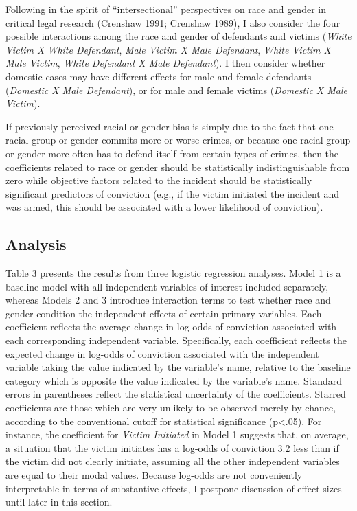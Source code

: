 \documentclass[12pt,article]{article}
\begin{document}
Following in the spirit of ``intersectional'' perspectives on race and
gender in critical legal research (Crenshaw 1991; Crenshaw 1989), I also
consider the four possible interactions among the race and gender of
defendants and victims (\emph{White Victim X White Defendant}, \emph{Male Victim X
Male Defendant}, \emph{White Victim X Male Victim}, \emph{White Defendant X Male
Defendant}). I then consider whether domestic cases may have different
effects for male and female defendants (\emph{Domestic X Male Defendant}), or
for male and female victims (\emph{Domestic X Male Victim}).

If previously perceived racial or gender bias is simply due to the fact
that one racial group or gender commits more or worse crimes, or because
one racial group or gender more often has to defend itself from certain
types of crimes, then the coefficients related to race or gender should
be statistically indistinguishable from zero while objective factors
related to the incident should be statistically significant predictors
of conviction (e.g., if the victim initiated the incident and was armed,
this should be associated with a lower likelihood of conviction).

\subsection{Analysis}\label{analysis}

Table 3 presents the results from three logistic regression analyses.
Model 1 is a baseline model with all independent variables of interest
included separately, whereas Models 2 and 3 introduce interaction terms
to test whether race and gender condition the independent effects of
certain primary variables. Each coefficient reflects the average change
in log-odds of conviction associated with each corresponding independent
variable. Specifically, each coefficient reflects the expected change in
log-odds of conviction associated with the independent variable taking
the value indicated by the variable's name, relative to the baseline category which is opposite
the value indicated by the variable's name. Standard errors in parentheses reflect the
statistical uncertainty of the coefficients. Starred coefficients are
those which are very unlikely to be observed merely by chance, according
to the conventional cutoff for statistical significance (p<.05). For instance, the coefficient for \emph{Victim
Initiated} in Model 1 suggests that, on average, a situation that the
victim initiates has a log-odds of conviction 3.2 less than if the
victim did not clearly initiate, assuming all the other independent
variables are equal to their modal values. Because log-odds are not
conveniently interpretable in terms of substantive effects, I postpone
discussion of effect sizes until later in this section.
\end{document}
